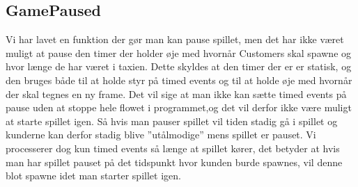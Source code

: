 \subsection{GamePaused}
   Vi har lavet en funktion der gør man kan pause spillet, men det har ikke været muligt at pause den timer der holder øje med hvornår Customers skal spawne og hvor længe de har været i taxien. Dette skyldes at den timer der er er statisk, og den bruges både til at holde styr på timed events og til at holde øje med hvornår der skal tegnes en ny frame. Det vil sige at man ikke kan sætte timed events på pause uden at stoppe hele flowet i programmet,og det vil derfor ikke være muligt at starte spillet igen. Så hvis man pauser spillet vil tiden stadig gå i spillet og kunderne kan derfor stadig blive ''utålmodige'' mens spillet er pauset. Vi processerer dog kun timed events så længe at spillet kører, det betyder at hvis man har spillet pauset på det tidspunkt hvor kunden burde spawnes, vil denne blot spawne idet man starter spillet igen.  
